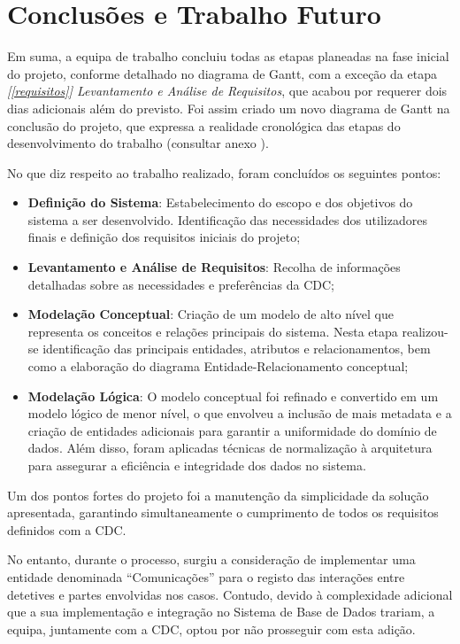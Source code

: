 \documentclass[a4paper,12pt]{scrreprt}
\begin{document}
\chapter{Conclusões e Trabalho Futuro}

    Em suma, a equipa de trabalho concluiu todas as etapas planeadas na fase inicial do projeto, conforme detalhado no diagrama de Gantt, com a exceção da etapa \textit{[\ref{requisitos}] Levantamento e Análise de Requisitos}, que acabou por requerer dois dias adicionais além do previsto. Foi assim criado um novo diagrama de Gantt na conclusão do projeto, que expressa a realidade cronológica das etapas do desenvolvimento do trabalho (consultar anexo ).

    No que diz respeito ao trabalho realizado, foram concluídos os seguintes pontos:
    \begin{itemize}
        \item \textbf{Definição do Sistema}: Estabelecimento do escopo e dos objetivos do sistema a ser desenvolvido. Identificação das necessidades dos utilizadores finais e definição dos requisitos iniciais do projeto;
        \item \textbf{Levantamento e Análise de Requisitos}: Recolha de informações detalhadas sobre as necessidades e preferências da CDC;
        \item \textbf{Modelação Conceptual}: Criação de um modelo de alto nível que representa os conceitos e relações principais do sistema. Nesta etapa realizou-se identificação das principais entidades, atributos e relacionamentos, bem como a elaboração do diagrama
        Entidade-Relacionamento conceptual;
        \item \textbf{Modelação Lógica}: O modelo conceptual foi refinado e convertido em um modelo lógico de menor nível, o que envolveu a inclusão de mais metadata e a criação de entidades adicionais para garantir a uniformidade do domínio de dados. Além disso, foram aplicadas técnicas de normalização à arquitetura para assegurar a eficiência e integridade dos dados no sistema.
    \end{itemize}

    Um dos pontos fortes do projeto foi a manutenção da simplicidade da solução apresentada, garantindo simultaneamente o cumprimento de todos os requisitos definidos com a CDC.

    No entanto, durante o processo, surgiu a consideração de implementar uma entidade denominada “Comunicações” para o registo das interações entre detetives e partes envolvidas nos casos. Contudo, devido à complexidade adicional que a sua implementação e integração no Sistema de Base de Dados trariam, a equipa, juntamente com a CDC, optou por não prosseguir com esta adição.
\end{document}
